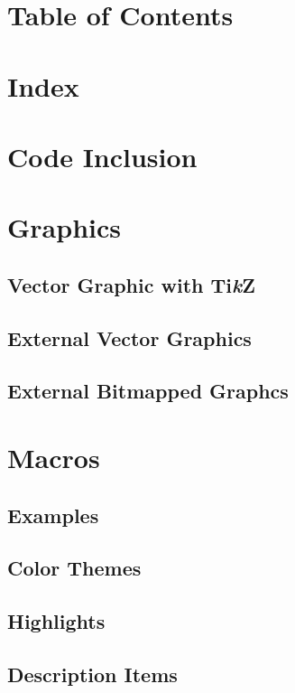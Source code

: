 \section{Table of Contents}
\section{Index}

\section{Code Inclusion}

\section{Graphics}
\subsection{Vector Graphic with Ti\textit{k}Z}
\subsection{External Vector Graphics}
\subsection{External Bitmapped Graphcs}

\section{Macros}


\subsection{Examples}

\subsection{Color Themes}
\subsection{Highlights}
\subsection{Description Items}

